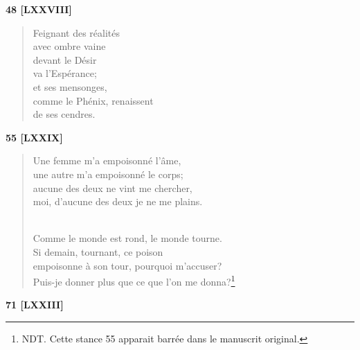 \documentclass[a4paper,12pt]{book}
\begin{document}
\bigskip

\begin{center} {\bf 48 [LXXVIII]} \end{center}

\begin{verse}
Feignant des réalités \\
avec ombre vaine \\
devant le Désir \\
va l'Espérance; \\
et ses mensonges, \\
comme le Phénix, renaissent \\
de ses cendres. \\
\end{verse}

\bigskip

\begin{center} {\bf 55 [LXXIX]} \end{center}

\begin{verse}
Une femme m'a empoisonné l'âme, \\
une autre m'a empoisonné le corps; \\
aucune des deux ne vint me chercher, \\
moi, d'aucune des deux je ne me plains. \\ \

Comme le monde est rond, le monde tourne. \\
Si demain, tournant, ce poison \\
empoisonne à son tour, pourquoi m'accuser? \\
Puis-je donner plus que ce que l'on me donna?\footnote{NDT. Cette stance 55 apparait barrée dans le manuscrit original.} \\
\end{verse}

\bigskip

\begin{center} {\bf 71 [LXXIII]} \end{center}
\end{document}
